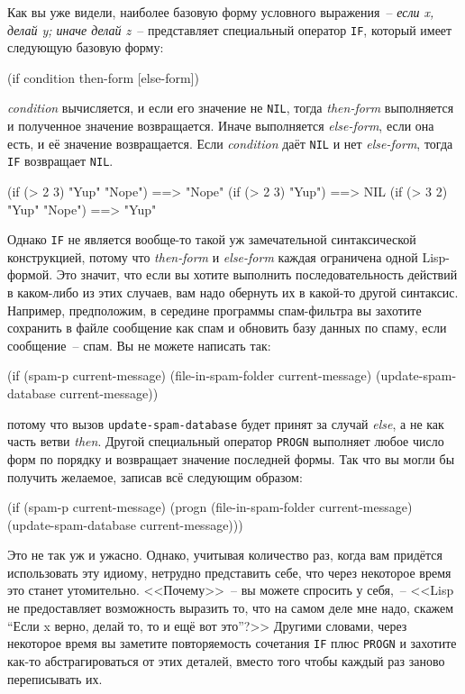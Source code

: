 Как вы уже видели, наиболее базовую форму условного выражения~-- \textit{если x, делай y;
  иначе делай z}~-- представляет специальный оператор \lstinline{IF}, который имеет следующую
базовую форму:

\begin{myverb}
(if condition then-form [else-form])
\end{myverb}

\noindent{}\textit{condition} вычисляется, и если его значение не \lstinline{NIL}, тогда
\textit{then-form} выполняется и полученное значение возвращается. Иначе выполняется
\textit{else-form}, если она есть, и её значение возвращается. Если \textit{condition}
даёт \lstinline{NIL} и нет \textit{else-form}, тогда \lstinline{IF} возвращает \lstinline{NIL}.

\begin{myverb}
(if (> 2 3) "Yup" "Nope") ==> "Nope"
(if (> 2 3) "Yup")        ==> NIL
(if (> 3 2) "Yup" "Nope") ==> "Yup"
\end{myverb}

Однако \lstinline{IF} не является вообще-то такой уж замечательной синтаксической
конструкцией, потому что \textit{then-form} и \textit{else-form} каждая ограничена одной
Lisp-формой. Это значит, что если вы хотите выполнить последовательность действий в
каком-либо из этих случаев, вам надо обернуть их в какой-то другой синтаксис. Например,
предположим, в середине программы спам-фильтра вы захотите сохранить в файле сообщение
как спам и обновить базу данных по спаму, если сообщение~-- спам. Вы не можете написать
так:

\begin{myverb}
(if (spam-p current-message)
    (file-in-spam-folder current-message)
    (update-spam-database current-message))
\end{myverb}

\noindent{}потому что вызов \lstinline{update-spam-database} будет принят за случай \textit{else}, а не
как часть ветви \textit{then}. Другой специальный оператор \lstinline{PROGN} выполняет любое
число форм по порядку и возвращает значение последней формы. Так что вы могли бы получить
желаемое, записав всё следующим образом:

\begin{myverb}
(if (spam-p current-message)
    (progn
      (file-in-spam-folder current-message)
      (update-spam-database current-message)))
\end{myverb}

Это не так уж и ужасно. Однако, учитывая количество раз, когда вам придётся использовать
эту идиому, нетрудно представить себе, что через некоторое время это станет
утомительно. <<Почему>>~-- вы можете спросить у себя,~-- <<Lisp не предоставляет возможность
выразить то, что на самом деле мне надо, скажем ``Если x верно, делай то, то и ещё вот
это''?>> Другими словами, через некоторое время вы заметите повторяемость сочетания
\lstinline{IF} плюс \lstinline{PROGN} и захотите как-то абстрагироваться от этих деталей, вместо
того чтобы каждый раз заново переписывать их.

